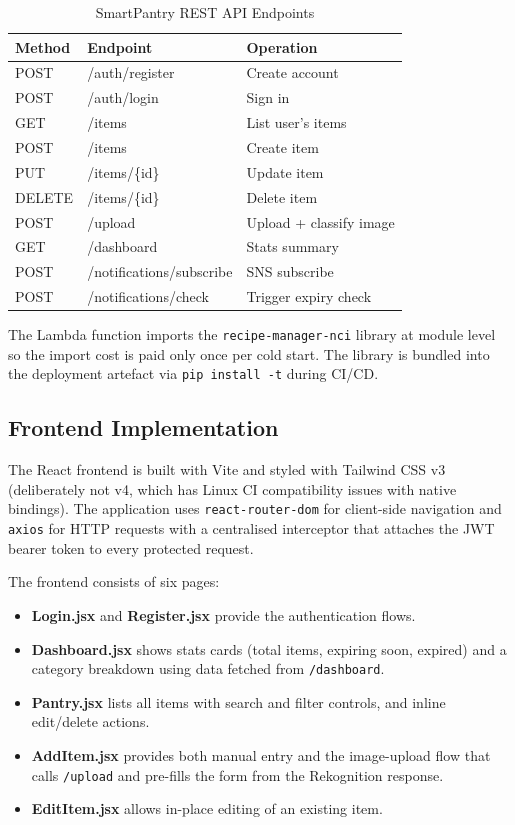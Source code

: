 \documentclass[conference]{IEEEtran}
\begin{document}
\begin{table}[htbp]
\centering
\caption{SmartPantry REST API Endpoints}
\begin{tabular}{lll}
\toprule
\textbf{Method} & \textbf{Endpoint} & \textbf{Operation} \\
\midrule
POST & /auth/register & Create account \\
POST & /auth/login & Sign in \\
GET & /items & List user's items \\
POST & /items & Create item \\
PUT & /items/\{id\} & Update item \\
DELETE & /items/\{id\} & Delete item \\
POST & /upload & Upload + classify image \\
GET & /dashboard & Stats summary \\
POST & /notifications/subscribe & SNS subscribe \\
POST & /notifications/check & Trigger expiry check \\
\bottomrule
\end{tabular}
\label{tab:endpoints}
\end{table}

The Lambda function imports the \texttt{recipe-manager-nci} library at module level so the import cost is paid only once per cold start. The library is bundled into the deployment artefact via \texttt{pip install -t} during CI/CD.

\subsection{Frontend Implementation}

The React frontend is built with Vite and styled with Tailwind CSS v3 (deliberately not v4, which has Linux CI compatibility issues with native bindings). The application uses \texttt{react-router-dom} for client-side navigation and \texttt{axios} for HTTP requests with a centralised interceptor that attaches the JWT bearer token to every protected request.

The frontend consists of six pages:

\begin{itemize}
    \item \textbf{Login.jsx} and \textbf{Register.jsx} provide the authentication flows.
    \item \textbf{Dashboard.jsx} shows stats cards (total items, expiring soon, expired) and a category breakdown using data fetched from \texttt{/dashboard}.
    \item \textbf{Pantry.jsx} lists all items with search and filter controls, and inline edit/delete actions.
    \item \textbf{AddItem.jsx} provides both manual entry and the image-upload flow that calls \texttt{/upload} and pre-fills the form from the Rekognition response.
    \item \textbf{EditItem.jsx} allows in-place editing of an existing item.
\end{itemize}
\end{document}
